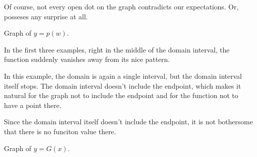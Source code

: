 \documentclass{ximera}
\begin{document}
Of course, not every open dot on the graph contradicts our expectations. Or, posseses any surprise at all.






Graph of $y = p(w)$.

\begin{image}
\end{image}








In the first three examples, right in the middle of the domain interval, the function suddenly vanishes away from its nice pattern. 

In this example, the domain is again a single interval, but the domain interval itself stops. The domain interval doesn’t include the endpoint, which makes it natural for the graph not to include the endpoint and for the function not to have a point there.

Since the domain interval itself doesn't include the endpoint, it is not bothersome that there is no funciton value there.








 
Graph of $y = G(x)$.
 
\end{document}
